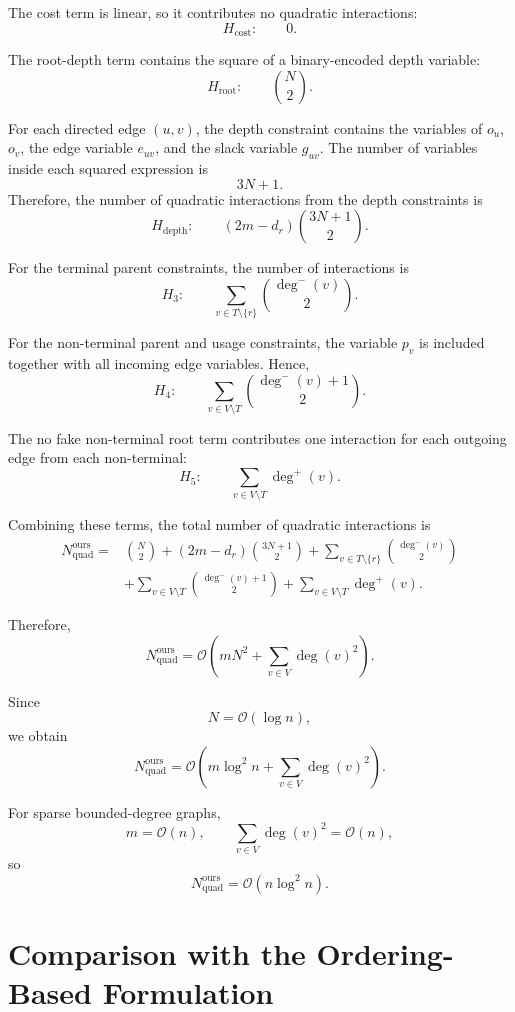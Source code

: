 \documentclass[a4paper,12pt]{report}
\begin{document}
The cost term is linear, so it contributes no quadratic interactions:
\[
H_{\text{cost}}:\qquad 0.
\]

The root-depth term contains the square of a binary-encoded depth variable:
\[
H_{\text{root}}:\qquad \binom{N}{2}.
\]

For each directed edge \((u,v)\), the depth constraint contains the variables of \(o_u\), \(o_v\), the edge variable \(e_{uv}\), and the slack variable \(g_{uv}\). The number of variables inside each squared expression is
\[
3N+1.
\]
Therefore, the number of quadratic interactions from the depth constraints is
\[
H_{\text{depth}}:
\qquad
(2m-d_r)\binom{3N+1}{2}.
\]

For the terminal parent constraints, the number of interactions is
\[
H_3:
\qquad
\sum_{v\in T\setminus\{r\}}
\binom{\deg^-(v)}{2}.
\]

For the non-terminal parent and usage constraints, the variable \(p_v\) is included together with all incoming edge variables. Hence,
\[
H_4:
\qquad
\sum_{v\in V\setminus T}
\binom{\deg^-(v)+1}{2}.
\]

The no fake non-terminal root term contributes one interaction for each outgoing edge from each non-terminal:
\[
H_5:
\qquad
\sum_{v\in V\setminus T}\deg^+(v).
\]

Combining these terms, the total number of quadratic interactions is
\[
\begin{aligned}
N_{\text{quad}}^{\text{ours}}
={}&
\binom{N}{2}
+
(2m-d_r)\binom{3N+1}{2}
+
\sum_{v\in T\setminus\{r\}}
\binom{\deg^-(v)}{2}
\\
&+
\sum_{v\in V\setminus T}
\binom{\deg^-(v)+1}{2}
+
\sum_{v\in V\setminus T}\deg^+(v).
\end{aligned}
\]

Therefore,
\[
N_{\text{quad}}^{\text{ours}}
=
\mathcal{O}
\left(
mN^2+\sum_{v\in V}\deg(v)^2
\right).
\]

Since
\[
N=\mathcal{O}(\log n),
\]
we obtain
\[
N_{\text{quad}}^{\text{ours}}
=
\mathcal{O}
\left(
m\log^2 n+\sum_{v\in V}\deg(v)^2
\right).
\]

For sparse bounded-degree graphs,
\[
m=\mathcal{O}(n),
\qquad
\sum_{v\in V}\deg(v)^2=\mathcal{O}(n),
\]
so
\[
N_{\text{quad}}^{\text{ours}}
=
\mathcal{O}(n\log^2 n).
\]

\section{Comparison with the Ordering-Based Formulation}
\end{document}
